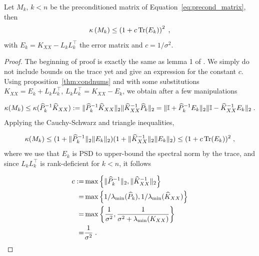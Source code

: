 \documentclass{article}
\begin{document}
\begin{lemma} \label{thm:pivchol_condnum}
Let $M_k$, $k < n$ be the preconditioned matrix of Equation~\eqref{eq:precond_matrix}, then 
\begin{equation*}
    \kappa \left( M_k \right)  \le \left( 1 + c \operatorname{Tr}(E_k) \right)^2 \;,
\end{equation*}
with $E_k = K_{XX} - L_kL_k^\top$ the error matrix and $c= 1/\sigma^2$.
\end{lemma}
\begin{proof}
The beginning of proof is exactly the same as lemma 1 of \cite{gardner_gpytorch_2021}. We simply do not include bounds on the trace yet and give an expression for the constant $c$. Using proposition~\ref{thm:condnums} and with some substitutions $K_{XX} = E_k + L_kL_k^\top$, $L_kL_k^\top = K_{XX} - E_k$, we obtain after a few manipulations

\begin{equation*}
    \kappa(M_k) \le \kappa(\widehat P_k^{-1} \widehat K_{XX}) := \norm{\widehat P_k^{-1} \widehat K_{XX}}_2 \norm{\widehat K_{XX}^{-1} \widehat P_k}_2 = \norm{\Id + \widehat P_k^{-1} E_k}_2 \norm{\Id - \widehat K_{XX}^{-1} E_k}_2 \;.
\end{equation*}
%
Applying the Cauchy-Schwarz and triangle inequalities, 

\begin{equation*}
    \kappa(M_k) \le (1 + \Vert \widehat P_k^{-1} \Vert_2 \Vert E_k \Vert_2) (1 + \Vert \widehat K_{XX}^{-1} \Vert_2 \Vert E_k \Vert_2) \le (1 + c \operatorname{Tr}(E_k))^2 \;,
\end{equation*}
%
where we use that $E_k$ is PSD to upper-bound the spectral norm by the trace, and since $L_kL_k^\top$ is rank-deficient for $k < n$, it follows

\begin{align*}
    c :=& \max \left\{ \Vert \widehat P_k^{-1} \Vert_2,  \Vert \widehat K_{XX}^{-1} \Vert_2 \right\} \\
    =& \max \left\{  1/\lambda_{\min} (\widehat P_k), 1/\lambda_{\min} (\widehat K_{XX}) \right\} \\
    =& \max\left\{ \frac{1}{\sigma^2}, \frac{1}{\sigma^2 + \lambda_{\min}(K_{XX})} \right\}\\
    =& \frac{1}{\sigma^2} \; .
\end{align*}
\end{proof}
\end{document}
